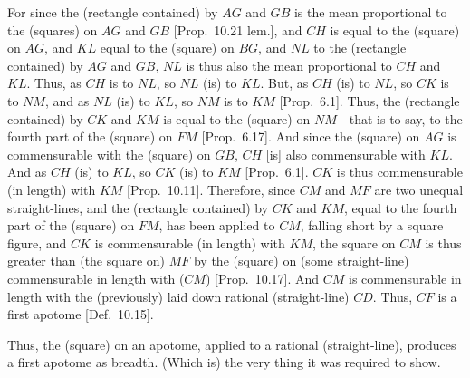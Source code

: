 \begin{Parallel}{}{}
{For since the (rectangle contained) by $AG$ and $GB$ is the
mean proportional to the (squares) on $AG$ and $GB$ [Prop.~10.21 lem.], and $CH$ is equal
to the (square) on $AG$, and $KL$ equal to the (square) on 
$BG$, and $NL$ to the (rectangle contained) by $AG$ and $GB$,
$NL$ is thus also the mean proportional to $CH$ and $KL$. Thus,
as $CH$ is to $NL$, so $NL$ (is) to $KL$. But, as $CH$ (is) to
$NL$, so $CK$ is to $NM$, and as $NL$ (is) to $KL$, so
$NM$ is to $KM$ [Prop.~6.1]. 
Thus, the (rectangle contained) by $CK$ and $KM$
is equal to the (square) on $NM$---that is to say, to the fourth
part of the (square) on $FM$ [Prop.~6.17]. 
And since the (square) on $AG$ is commensurable with the
(square) on $GB$, $CH$ [is] also commensurable with
$KL$. And as $CH$ (is) to $KL$, so $CK$ (is) to $KM$ [Prop.~6.1]. $CK$ is thus
commensurable (in length) with $KM$ [Prop.~10.11].  Therefore, since $CM$ and
$MF$ are two unequal straight-lines, and the (rectangle
contained) by $CK$ and $KM$, equal to the fourth part of the
(square) on $FM$, has been applied to $CM$, falling short by a square figure, and $CK$ is commensurable
(in length) with $KM$,  the square on $CM$ is thus greater than
(the square on) $MF$ by the (square) on (some straight-line)
commensurable in length with ($CM$) [Prop.~10.17]. 
And $CM$ is commensurable in length with the (previously) laid down rational (straight-line) $CD$. Thus, $CF$ is a first apotome [Def.~10.15].

Thus, the (square) on an apotome, applied to a rational (straight-line),
produces  a first apotome as breadth. (Which is) the very thing it was required to show.}
\end{Parallel}

